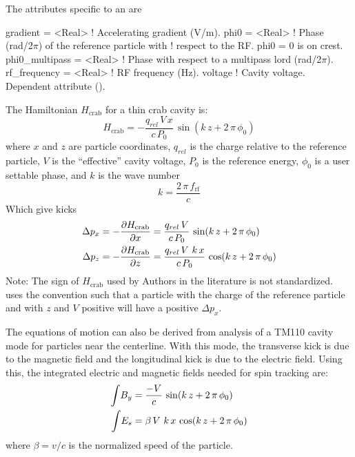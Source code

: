 The attributes specific to an  are 
\begin{example}
  gradient        = <Real>    ! Accelerating gradient (V/m).
  phi0            = <Real>    ! Phase (rad/2\(\pi\)) of the reference particle with 
                              !   respect to the RF. phi0 = 0 is on crest.
  phi0_multipass  = <Real>    ! Phase with respect to a multipass lord (rad/2\(\pi\)).
  rf_frequency    = <Real>    ! RF frequency (Hz).
  voltage                     ! Cavity voltage. Dependent attribute ().
\end{example}

The Hamiltonian  $H_{\text{crab}}$ for a thin crab cavity is\cite{b:crab1}:
\begin{equation}
  H_{\text{crab}} = -\frac{q_{rel} \, V\, x}{c \, P_0} \, \sin(k \, z + 2 \, \pi \, \phi_0)
\end{equation}
where $x$ and $z$ are particle coordinates, $q_{rel}$ is the charge relative to the reference
particle, $V$ is the ``effective'' cavity voltage, $P_0$ is the reference energy, $\phi_0$ is a user settable
phase, and $k$ is the wave number
\begin{equation}
  k = \frac{2 \, \pi \, f_{\text{rf}}}{c}
\end{equation}
Which give kicks 
\begin{align} 
  \Delta p_x &= -\frac{\partial H_{\text{crab}}}{\partial x} = 
    \frac{q_{rel} \, V}{c \, P_0} \, \sin(k \, z + 2 \, \pi \, \phi_0) \nonumber \\ 
  \Delta p_z &= -\frac{\partial H_{\text{crab}}}{\partial z} = 
    \frac{q_{rel} \, V \, \, k \, x}{c \, P_0} \, \cos(k \, z + 2 \, \pi \, \phi_0) 
\end{align} 
Note: The sign of $H_{\text{crab}}$ used by Authors in the literature is not standardized. \bmad
uses the convention such that a particle with the charge of the reference particle and with $z$ and
$V$ positive will have a positive $\Delta p_x$.

The equations of motion can also be derived from analysis of a TM110 cavity mode for particles near
the centerline\cite{b:kim}. With this mode, the transverse kick is due to the magnetic field and the
longitudinal kick is due to the electric field. Using this, the integrated electric and magnetic
fields needed for spin tracking are:
\begin{align}
  \int \! B_y &= \frac{-V}{c} \, \sin(k \, z + 2 \, \pi \, \phi_0) \nonumber \\ 
  \int \! E_s &=  \beta \, V \, \, k \, x \, \cos(k \, z + 2 \, \pi \, \phi_0) 
\end{align}
where $\beta = v/c$ is the normalized speed of the particle.

